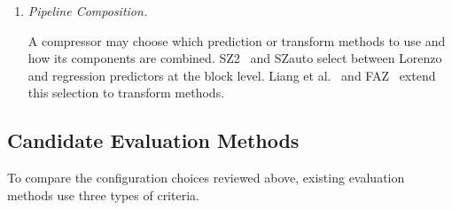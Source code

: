 \begin{enumerate}
\item \emph{Pipeline Composition.}\par\noindent\mbox{\hspace{1em}}A compressor may choose which prediction or transform methods to use and how its components are combined. SZ2~\cite{liang2018error} and SZauto select between Lorenzo and regression predictors at the block level. Liang et al.~\cite{liang2019significantly} and FAZ~\cite{liu2023faz} extend this selection to transform methods.
\end{enumerate}

\subsection{Candidate Evaluation Methods}
\label{sec:related-work:evaluation}

To compare the configuration choices reviewed above, existing evaluation methods use three types of criteria.

